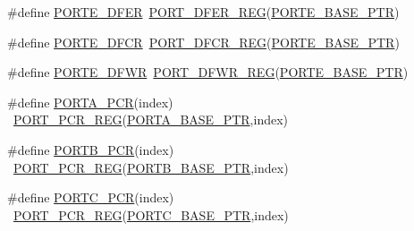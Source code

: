 \begin{DoxyCompactItemize}
\item 
\#define \hyperlink{group___p_o_r_t___register___accessor___macros_ga1dc4e1ae5189bee16746bd977599b628}{P\+O\+R\+T\+E\+\_\+\+D\+F\+ER}~\hyperlink{group___p_o_r_t___register___accessor___macros_gaf4400f8add6cb007e24074363387e938}{P\+O\+R\+T\+\_\+\+D\+F\+E\+R\+\_\+\+R\+EG}(\hyperlink{group___p_o_r_t___peripheral_gab166fe285bbb15b52de610f408fe25d3}{P\+O\+R\+T\+E\+\_\+\+B\+A\+S\+E\+\_\+\+P\+TR})
\item 
\#define \hyperlink{group___p_o_r_t___register___accessor___macros_ga7b9f4bac8ba05d97d953cfdc256f632d}{P\+O\+R\+T\+E\+\_\+\+D\+F\+CR}~\hyperlink{group___p_o_r_t___register___accessor___macros_ga317b840ce4f1cdc8a67975e5ddc85b05}{P\+O\+R\+T\+\_\+\+D\+F\+C\+R\+\_\+\+R\+EG}(\hyperlink{group___p_o_r_t___peripheral_gab166fe285bbb15b52de610f408fe25d3}{P\+O\+R\+T\+E\+\_\+\+B\+A\+S\+E\+\_\+\+P\+TR})
\item 
\#define \hyperlink{group___p_o_r_t___register___accessor___macros_ga63116ba8466ead6e2559334c13c38c60}{P\+O\+R\+T\+E\+\_\+\+D\+F\+WR}~\hyperlink{group___p_o_r_t___register___accessor___macros_gaea4b1adf59e177a14afea996b6e56d93}{P\+O\+R\+T\+\_\+\+D\+F\+W\+R\+\_\+\+R\+EG}(\hyperlink{group___p_o_r_t___peripheral_gab166fe285bbb15b52de610f408fe25d3}{P\+O\+R\+T\+E\+\_\+\+B\+A\+S\+E\+\_\+\+P\+TR})
\item 
\#define \hyperlink{group___p_o_r_t___register___accessor___macros_ga35d4fd0500a0759697a40137dea62a41}{P\+O\+R\+T\+A\+\_\+\+P\+CR}(index)                                              ~\hyperlink{group___p_o_r_t___register___accessor___macros_gac6f8c9eab2e63700616f4d4fa4a6ef0e}{P\+O\+R\+T\+\_\+\+P\+C\+R\+\_\+\+R\+EG}(\hyperlink{group___p_o_r_t___peripheral_gaa18ec7594fe603225220ec6eda4a19ce}{P\+O\+R\+T\+A\+\_\+\+B\+A\+S\+E\+\_\+\+P\+TR},index)
\item 
\#define \hyperlink{group___p_o_r_t___register___accessor___macros_ga551c76757a3ebc18de031a5e45bee678}{P\+O\+R\+T\+B\+\_\+\+P\+CR}(index)                                              ~\hyperlink{group___p_o_r_t___register___accessor___macros_gac6f8c9eab2e63700616f4d4fa4a6ef0e}{P\+O\+R\+T\+\_\+\+P\+C\+R\+\_\+\+R\+EG}(\hyperlink{group___p_o_r_t___peripheral_ga585b4782d1ceb44492289af0019480f9}{P\+O\+R\+T\+B\+\_\+\+B\+A\+S\+E\+\_\+\+P\+TR},index)
\item 
\#define \hyperlink{group___p_o_r_t___register___accessor___macros_ga7eac1367167d119a0388f82fe7f8dd44}{P\+O\+R\+T\+C\+\_\+\+P\+CR}(index)                                              ~\hyperlink{group___p_o_r_t___register___accessor___macros_gac6f8c9eab2e63700616f4d4fa4a6ef0e}{P\+O\+R\+T\+\_\+\+P\+C\+R\+\_\+\+R\+EG}(\hyperlink{group___p_o_r_t___peripheral_ga03c740cdda17711afafc932723871474}{P\+O\+R\+T\+C\+\_\+\+B\+A\+S\+E\+\_\+\+P\+TR},index)

\end{DoxyCompactItemize}
